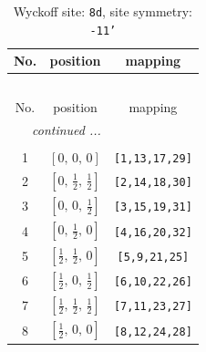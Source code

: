 \documentclass[fleqn,8pt]{jsarticle}
\begin{document}
\begin{longtable}{ccc}
\caption{Wyckoff site: {\tt 8d}, site symmetry: {\tt -11'}}
 \\
 \hline \hline
No. & position & mapping \\ \hline \endfirsthead

\multicolumn{2}{l}{\tablename\ \thetable{}} \\
 \hline \hline
No. & position & mapping \\ \hline \endhead

 \hline \hline
\multicolumn{2}{r}{\footnotesize\it continued ...} \\ \endfoot

 \hline \hline
\multicolumn{2}{r}{} \\ \endlastfoot

1 & $\left[ 0,\, 0,\, 0 \right]$ & {\tt [1,13,17,29]} \\ \hline
2 & $\left[ 0,\, \frac{1}{2},\, \frac{1}{2} \right]$ & {\tt [2,14,18,30]} \\ \hline
3 & $\left[ 0,\, 0,\, \frac{1}{2} \right]$ & {\tt [3,15,19,31]} \\ \hline
4 & $\left[ 0,\, \frac{1}{2},\, 0 \right]$ & {\tt [4,16,20,32]} \\ \hline
5 & $\left[ \frac{1}{2},\, \frac{1}{2},\, 0 \right]$ & {\tt [5,9,21,25]} \\ \hline
6 & $\left[ \frac{1}{2},\, 0,\, \frac{1}{2} \right]$ & {\tt [6,10,22,26]} \\ \hline
7 & $\left[ \frac{1}{2},\, \frac{1}{2},\, \frac{1}{2} \right]$ & {\tt [7,11,23,27]} \\ \hline
8 & $\left[ \frac{1}{2},\, 0,\, 0 \right]$ & {\tt [8,12,24,28]} \\
\end{longtable}
\renewcommand{\arraystretch}{1.2}
\end{document}
